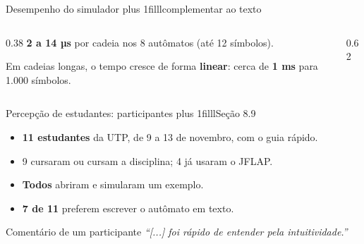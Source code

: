 \documentclass[aspectratio=169,12pt]{beamer}
\newcommand{\notexto}[1]{\hskip 0pt plus 1filll{\normalfont\small\color{white!85!acento}#1}}
\begin{document}
\begin{frame}{Desempenho do simulador\notexto{complementar ao texto}}
  \begin{columns}[T]
    \begin{column}{0.38\textwidth}
      \vspace{6pt}
      \textbf{2 a 14 µs} por cadeia nos 8 autômatos (até 12 símbolos).
      \vspace{10pt}

      Em cadeias longas, o tempo cresce de forma \textbf{linear}: cerca de
      \textbf{1 ms} para 1.000 símbolos.
    \end{column}
    \begin{column}{0.62\textwidth}
      \centering
    \end{column}
  \end{columns}
\end{frame}

\begin{frame}{Percepção de estudantes: participantes\notexto{Seção 8.9}}
  \begin{itemize}
    \item \textbf{11 estudantes} da UTP, de 9 a 13 de novembro, com o guia rápido.
    \item 9 cursaram ou cursam a disciplina; 4 já usaram o JFLAP.
    \item \textbf{Todos} abriram e simularam um exemplo.
    \item \textbf{7 de 11} preferem escrever o autômato em texto.
  \end{itemize}
  \vspace{8pt}
  \begin{block}{Comentário de um participante}
    \itshape ``[...] foi rápido de entender pela intuitividade.''
  \end{block}
\end{frame}
\end{document}
